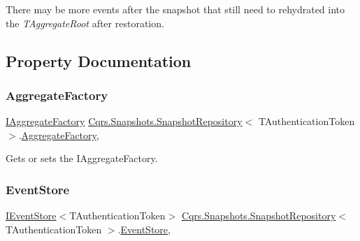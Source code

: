 There may be more events after the snapshot that still need to rehydrated into the {\itshape T\+Aggregate\+Root}  after restoration.

\subsection{Property Documentation}
\mbox{\label{classCqrs_1_1Snapshots_1_1SnapshotRepository_a833748fa79fd234067b61927c57bc60f_a833748fa79fd234067b61927c57bc60f}} 
\subsubsection{\texorpdfstring{Aggregate\+Factory}{AggregateFactory}}
{\footnotesize\ttfamily \hyperlink{interfaceCqrs_1_1Domain_1_1Factories_1_1IAggregateFactory}{I\+Aggregate\+Factory} \hyperlink{classCqrs_1_1Snapshots_1_1SnapshotRepository}{Cqrs.\+Snapshots.\+Snapshot\+Repository}$<$ T\+Authentication\+Token $>$.\hyperlink{classCqrs_1_1Domain_1_1Factories_1_1AggregateFactory}{Aggregate\+Factory}\hspace{0.3cm}{\ttfamily [get]}, {\ttfamily [protected]}}



Gets or sets the I\+Aggregate\+Factory. 

\mbox{\label{classCqrs_1_1Snapshots_1_1SnapshotRepository_a34f46341da207beab43bb96b20514976_a34f46341da207beab43bb96b20514976}} 
\subsubsection{\texorpdfstring{Event\+Store}{EventStore}}
{\footnotesize\ttfamily \hyperlink{interfaceCqrs_1_1Events_1_1IEventStore}{I\+Event\+Store}$<$T\+Authentication\+Token$>$ \hyperlink{classCqrs_1_1Snapshots_1_1SnapshotRepository}{Cqrs.\+Snapshots.\+Snapshot\+Repository}$<$ T\+Authentication\+Token $>$.\hyperlink{classCqrs_1_1Events_1_1EventStore}{Event\+Store}\hspace{0.3cm}{\ttfamily [get]}, {\ttfamily [protected]}}



